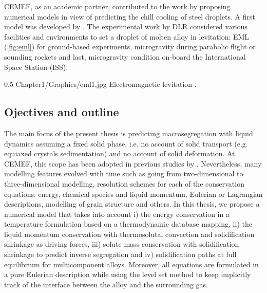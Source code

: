 CEMEF, as an academic partner, contributed to the work by proposing numerical models in view of predicting the chill cooling of steel droplets. 
A first model was developed by \citet{rivaux_simulation_2011}. 
The experimental work by DLR considered various facilities and environments to set a droplet of molten alloy in levitation: 
EML (\cref{fig:eml}) for ground-based experiments, 
microgravity during parabolic flight or sounding rockets and last, microgravity condition on-board the International Space Station (ISS).
\begin{figureth}
{0.5}
{Chapter1/Graphics/eml1.jpg}
{Electromagnetic levitation \citep{dlr_electomagnetic_2014}.}
\label{fig:eml}
\end{figureth}
%
\subsection{Ojectives and outline}
The main focus of the present thesis is predicting macrosegregation with liquid dynamics assuming a fixed solid phase, i.e. no account of solid 
transport (e.g. equiaxed crystals sedimentation) and no account of solid deformation. At CEMEF, this scope has been adopted in previous 
studies by \citet{gouttebroze_modelisation_2005, liu_finite_2005, mosbah_multiple_2008, rivaux_simulation_2011, carozzani_developpement_2012}.
Nevertheless, many modelling features evolved with time such as going from two-dimensional to three-dimensional modelling, resolution schemes
for each of the conservation equations: energy, chemical species and liquid momentum, Eulerian or Lagrangian descriptions, 
modelling of grain structure and others. In this thesis, we propose a numerical model that takes into account 
i) the energy conservation in a temperature formulation based on a thermodynamic database mapping,
ii) the liquid momentum conservation with thermosolutal convection and solidification shrinkage as driving forces, 
iii) solute mass conservation with solidification shrinkage to predict inverse segregation and 
iv) solidification paths at full equilibrium for multicomponent alloys. 
Moreover, all equations are formulated in a pure Eulerian description while using the level set method to keep 
implicitly track of the interface between the alloy and the surrounding gas. 

